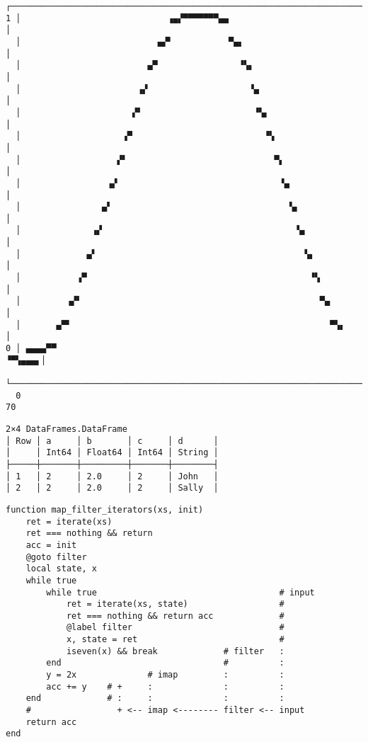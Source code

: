 \begin{lstlisting}[]
  ┌──────────────────────────────────────────────────────────────────────┐
1 │                             ▗▄▞▀▀▀▀▀▀▀▄▄                             │
  │                           ▄▞▘           ▀▄▖                          │
  │                         ▄▀                ▝▚▖                        │
  │                       ▗▞                    ▝▄                       │
  │                      ▞▘                      ▝▚▖                     │
  │                    ▗▀                          ▝▚                    │
  │                   ▞▘                             ▀▖                  │
  │                 ▗▞                                ▝▄                 │
  │                ▄▘                                   ▚▖               │
  │              ▗▞                                      ▝▄              │
  │             ▄▘                                         ▚▖            │
  │           ▗▀                                            ▝▚           │
  │         ▗▞▘                                               ▀▄         │
  │       ▄▀▘                                                   ▀▚▖      │
0 │ ▄▄▄▄▀▀                                                        ▝▀▚▄▄▄▖│
  └──────────────────────────────────────────────────────────────────────┘
  0                                                                     70
\end{lstlisting}




\begin{lstlisting}[]
2×4 DataFrames.DataFrame
│ Row │ a     │ b       │ c     │ d      │
│     │ Int64 │ Float64 │ Int64 │ String │
├─────┼───────┼─────────┼───────┼────────┤
│ 1   │ 2     │ 2.0     │ 2     │ John   │
│ 2   │ 2     │ 2.0     │ 2     │ Sally  │
\end{lstlisting}




\begin{lstlisting}[]
function map_filter_iterators(xs, init)
    ret = iterate(xs)
    ret === nothing && return
    acc = init
    @goto filter
    local state, x
    while true
        while true                                    # input
            ret = iterate(xs, state)                  #
            ret === nothing && return acc             #
            @label filter                             #
            x, state = ret                            #
            iseven(x) && break             # filter   :
        end                                #          :
        y = 2x              # imap         :          :
        acc += y    # +     :              :          :
    end             # :     :              :          :
    #                 + <-- imap <-------- filter <-- input
    return acc
end
\end{lstlisting}




